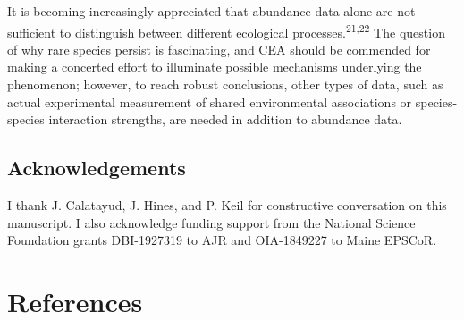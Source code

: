 \documentclass[
]{article}
\begin{document}
It is becoming increasingly appreciated that abundance data alone are
not sufficient to distinguish between different ecological
processes.\textsuperscript{21,22} The question of why rare species
persist is fascinating, and CEA should be commended for making a
concerted effort to illuminate possible mechanisms underlying the
phenomenon; however, to reach robust conclusions, other types of data,
such as actual experimental measurement of shared environmental
associations or species-species interaction strengths, are needed in
addition to abundance data.

\hypertarget{acknowledgements}{%
\subsection{Acknowledgements}\label{acknowledgements}}

I thank J. Calatayud, J. Hines, and P. Keil for constructive
conversation on this manuscript. I also acknowledge funding support from
the National Science Foundation grants DBI-1927319 to AJR and
OIA-1849227 to Maine EPSCoR.

\clearpage

\hypertarget{references}{%
\section*{References}\label{references}}
\end{document}

